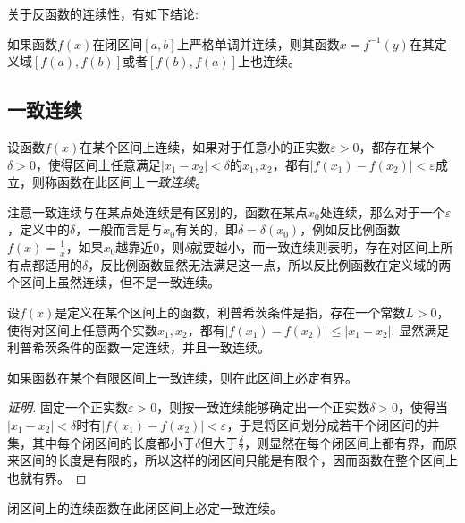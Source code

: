 关于反函数的连续性，有如下结论:
\begin{theorem}
  如果函数$f(x)$在闭区间$[a,b]$上严格单调并连续，则其函数$x=f^{-1}(y)$在其定义域$[f(a),f(b)]$或者$[f(b),f(a)]$上也连续。
\end{theorem}

\subsection{一致连续}
\label{sec:uniform-continuity}

\begin{definition}
  设函数$f(x)$在某个区间上连续，如果对于任意小的正实数$\varepsilon>0$，都存在某个$\delta>0$，使得区间上任意满足$|x_1-x_2|<\delta$的$x_1,x_2$，都有$|f(x_1)-f(x_2)|<\varepsilon$成立，则称函数在此区间上\emph{一致连续}。
\end{definition}

注意一致连续与在某点处连续是有区别的，函数在某点$x_0$处连续，那么对于一个$\varepsilon$，定义中的$\delta$，一般而言是与$x_0$有关的，即$\delta=\delta(x_0)$，例如反比例函数$f(x)=\frac{1}{x}$，如果$x_0$越靠近0，则$\delta$就要越小，而一致连续则表明，存在对区间上所有点都适用的$\delta$，反比例函数显然无法满足这一点，所以反比例函数在定义域的两个区间上虽然连续，但不是一致连续。

\begin{example}[利普希茨连续]
  设$f(x)$是定义在某个区间上的函数，利普希茨条件是指，存在一个常数$L>0$，使得对区间上任意两个实数$x_1,x_2$，都有$|f(x_1)-f(x_2)| \leqslant |x_1-x_2|$. 显然满足利普希茨条件的函数一定连续，并且一致连续。
\end{example}

\begin{theorem}
  如果函数在某个有限区间上一致连续，则在此区间上必定有界。
\end{theorem}

\begin{proof}[证明]
  固定一个正实数$\varepsilon>0$，则按一致连续能够确定出一个正实数$\delta>0$，使得当$|x_1-x_2|<\delta$时有$|f(x_1)-f(x_2)|<\varepsilon$，于是将区间划分成若干个闭区间的并集，其中每个闭区间的长度都小于$\delta$但大于$\frac{\delta}{2}$，则显然在每个闭区间上都有界，而原来区间的长度是有限的，所以这样的闭区间只能是有限个，因而函数在整个区间上也就有界。
\end{proof}

\begin{theorem}
  闭区间上的连续函数在此闭区间上必定一致连续。
\end{theorem}

